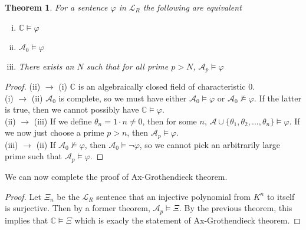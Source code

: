 \documentclass[a4paper]{article}
\newtheorem{theorem}{Theorem}[section]
\newcommand{\C}{\mathbb{C}}
\begin{document}
\begin{theorem} For a sentence $\varphi$ in $\mathcal{L}_{R}$ the following are equivalent
\begin{enumerate}[i.]
	\item $\C \models \varphi$
	\item $\mathcal{A}_{0} \models \varphi$
	\item There exists an $N$ such that for all prime $p > N$, $\mathcal{A}_{p} \models \varphi$
\end{enumerate}
\end{theorem}
\begin{proof}
(ii) $\to$ (i) $\C$ is an algebraically closed field of characteristic 0. \\

(i) $\to$ (ii) $\mathcal{A}_{0}$ is complete, so we must have either $\mathcal{A}_{0} \models \varphi$ or $\mathcal{A}_{0} \not\models \varphi$. If the latter is true, then we cannot possibly have $\C \models \varphi$.\\

(ii) $\to$ (iii) If we define $\theta_{n} = 1 \cdot n \neq 0$, then for some $n$, $\mathcal{A} \cup \{\theta_{1}, \theta_{2}, ..., \theta_{n} \} \models \varphi$. If we now just choose a prime $p > n$, then $\mathcal{A}_{p} \models \varphi$.\\

(iii) $\to$ (ii) If $\mathcal{A}_{0} \not\models \varphi$, then $\mathcal{A}_{0} \models \lnot \varphi$, so we cannot pick an arbitrarily large prime such that $\mathcal{A}_{p} \models \varphi$.
\end{proof}

We can now complete the proof of Ax-Grothendieck theorem.
\begin{proof}
	Let $\Xi_{n}$ be the $\mathcal{L}_{R}$ sentence that an injective polynomial from $K^n$ to itself is surjective. Then by a former theorem, $\mathcal{A}_{p} \models \Xi$. By the previous theorem, this implies that $\C \models \Xi$ which is exacly the statement of Ax-Grothendieck theorem.
\end{proof}
\end{document}
